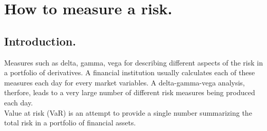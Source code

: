 \documentclass{book}
\begin{document}
\section{How to measure a risk.}
\subsection{Introduction.}
Measures such as delta, gamma, vega for describing different aspects of the risk in a portfolio of derivatives. A financial institution usually calculates each of these measures each day for every market variables. A delta-gamma-vega analysis, therfore, leads to a very large number of different risk measures being produced each day.\\
Value at risk (VaR) is an attempt to provide a single number summarizing the total risk in a portfolio of financial assets.
\end{document}
